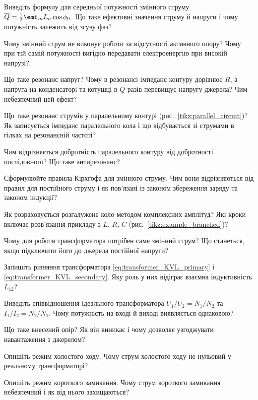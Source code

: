 \begin{Questions}
\begin{quizlist}
	\item Виведіть формулу для середньої потужності змінного струму $\overline Q = \frac12\emf_mI_m\cos\phi_0$. Що таке ефективні значення струму й напруги і чому потужність залежить від зсуву фаз?
	\item Чому змінний струм не виконує роботи за відсутності активного опору? Чому при тій самій потужності вигідно передавати електроенергію при високій напрузі?
	\item Що таке резонанс напруг? Чому в резонансі імпеданс контуру дорівнює $R$, а напруга на конденсаторі та котушці в $Q$ разів перевищує напругу джерела? Чим небезпечний цей ефект?
	\item Що таке резонанс струмів у паралельному контурі (рис.~\ref{tikz:parallel_circuit})? Як записується імпеданс паралельного кола і що відбувається зі струмами в гілках на резонансній частоті?
	\item Чим відрізняється добротність паралельного контуру від добротності послідовного? Що таке антирезонанс?
	\item Сформулюйте правила Кірхгофа для змінного струму. Чим вони відрізняються від правил для постійного струму і як пов'язані із законом збереження заряду та законом індукції?
	\item Як розраховується розгалужене коло методом комплексних амплітуд? Які кроки включає розв'язання прикладу з $L$, $R$, $C$ (рис.~\ref{tikz:example_branched})?
	\item Чому для роботи трансформатора потрібен саме змінний струм? Що станеться, якщо підключити його до джерела постійної напруги?
	\item Запишіть рівняння трансформатора \eqref{eq:transformer_KVL_primary} і \eqref{eq:transformer_KVL_secondary}. Яку роль у них відіграє взаємна індуктивність $L_{12}$?
	\item Виведіть співвідношення ідеального трансформатора $U_1/U_2 = N_1/N_2$ та $I_1/I_2 = N_2/N_1$. Чому потужність на вході й виході виявляється однаковою?
	\item Що таке внесений опір? Як він виникає і чому дозволяє узгоджувати навантаження з джерелом?
	\item Опишіть режим холостого ходу. Чому струм холостого ходу не нульовий у реальному трансформаторі?
	\item Опишіть режим короткого замикання. Чому струм короткого замикання небезпечний і як від нього захищаються?

\end{quizlist}
\end{Questions}
